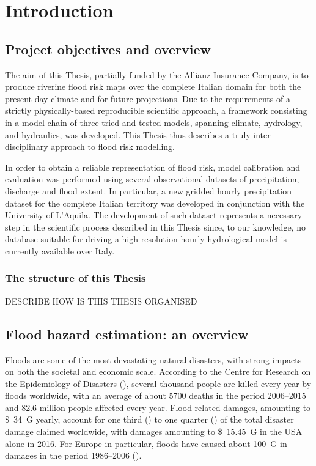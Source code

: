 \chapter{Introduction}

\section{Project objectives and overview}
The aim of this Thesis, partially funded by the Allianz Insurance Company, is to produce riverine flood risk maps over the complete Italian domain for both the present day climate and for future projections. Due to the requirements of a strictly physically-based reproducible scientific approach, a framework consisting in a model chain of three tried-and-tested models, spanning climate, hydrology, and hydraulics, was developed. This Thesis thus describes a truly inter-disciplinary approach to flood risk modelling.

In order to obtain a reliable representation of flood risk, model calibration and evaluation was performed using several observational datasets of precipitation, discharge and flood extent. In particular, a new gridded hourly precipitation dataset for the complete Italian territory was developed in conjunction with the University of L'Aquila. The development of such dataset represents a necessary step in the scientific process described in this Thesis since, to our knowledge, no database suitable for driving a high-resolution hourly hydrological model is currently available over Italy.\\

\subsection{The structure of this Thesis}
DESCRIBE HOW IS THIS THESIS ORGANISED

\section{Flood hazard estimation: an overview} \label{sec:flood_overview}
Floods are some of the most devastating natural disasters, with strong impacts on both the societal and economic scale. According to the Centre for Research on the Epidemiology of Disasters (\cite{Guha-sapir2011}), several thousand people are killed every year by floods worldwide, with an average of about 5700 deaths in the period 2006--2015 and 82.6 million people affected every year. Flood-related damages, amounting to \SI{34}[\$]{G} yearly, account for one third (\cite{MunichRE}) to one quarter (\cite{Guha-sapir2011}) of the total disaster damage claimed worldwide, with damages amounting to \SI{15.45}[\$]{G} in the USA alone in 2016. For Europe in particular, floods have caused about \SI{100}[\€]{G} in damages in the period 1986--2006 (\cite{Cea2007}).


